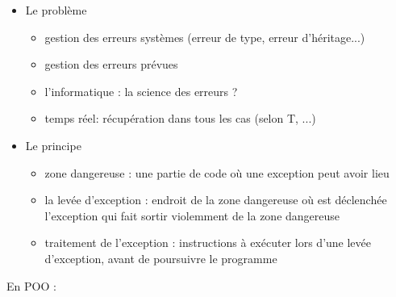 \documentclass{article}
\begin{document}
\begin{itemize}
	\item Le problème
	\begin{itemize}		
		\item gestion des erreurs systèmes (erreur de type, erreur d'héritage...)
		\item gestion des erreurs prévues
		\item l'informatique : la science des erreurs ?
		\item temps réel: récupération dans tous les cas (selon T, ...)
	\end{itemize}
	\item Le principe
	\begin{itemize}			
		\item zone dangereuse : une partie de code où une exception peut avoir lieu
		\item la levée d'exception : endroit de la zone dangereuse où est déclenchée
			l’exception qui fait sortir violemment de la zone dangereuse
		\item traitement de l’exception : instructions à exécuter lors d’une levée
			d’exception, avant de poursuivre le programme
	\end{itemize}
\end{itemize}

En POO : 
\end{document}

